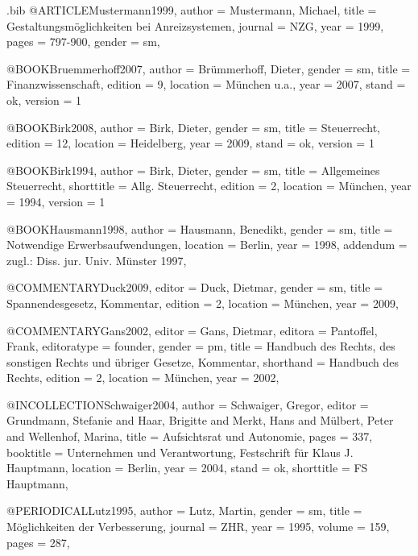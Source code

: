 %
\begin{filecontents}{\jobname.bib}
@ARTICLE{Mustermann1999,
  author = {Mustermann, Michael},
  title = {Gestaltungsmöglichkeiten bei Anreizsystemen},
  journal = {NZG},
  year = {1999},
  pages = {797-900},
  gender = {sm},
}

@BOOK{Bruemmerhoff2007,
  author = {Brümmerhoff, Dieter},
  gender = {sm},
  title = {Finanzwissenschaft},
  edition = {9},
  location = {München u.a.},
  year = {2007},
  stand = {ok},
  version = {1}
}

@BOOK{Birk2008,
  author = {Birk, Dieter},
  gender = {sm},
  title = {Steuerrecht},
  edition = {12},
  location = {Heidelberg},
  year = {2009},
  stand = {ok},
  version = {1}
}

@BOOK{Birk1994,
  author = {Birk, Dieter},
  gender = {sm},
  title = {Allgemeines Steuerrecht},
  shorttitle = {Allg. Steuerrecht},
  edition = {2},
  location = {München},
  year = {1994},
  version = {1}
}

@BOOK{Hausmann1998,
  author = {Hausmann, Benedikt},
  gender = {sm},
  title = {Notwendige Erwerbsaufwendungen},
  location = {Berlin},
  year = {1998},
  addendum = {zugl.: Diss. jur. Univ. Münster 1997},
}

@COMMENTARY{Duck2009,
  editor = {Duck, Dietmar},
  gender = {sm},
  title = {Spannendesgesetz, Kommentar},
  edition = {2},
  location = {München},
  year = {2009},
}

@COMMENTARY{Gans2002,
  editor = {Gans, Dietmar},
  editora = {Pantoffel, Frank},
  editoratype = {founder},
  gender = {pm},
  title = {Handbuch des Rechts, des sonstigen Rechts und übriger Gesetze, Kommentar},
  shorthand = {Handbuch des Rechts},
  edition = {2},
  location = {München},
  year = {2002},
}

@INCOLLECTION{Schwaiger2004,
  author = {Schwaiger, Gregor},
  editor = {Grundmann, Stefanie and Haar, Brigitte and Merkt, Hans and Mülbert,
	Peter and Wellenhof, Marina},
  title = {Aufsichtsrat und Autonomie},
  pages = {337},
  booktitle = {Unternehmen und Verantwortung, Festschrift für Klaus J. Hauptmann},
  location = {Berlin},
  year = {2004},
  stand = {ok},
  shorttitle = {FS Hauptmann},
}

@PERIODICAL{Lutz1995,
  author = {Lutz, Martin},
  gender = {sm},
  title = {Möglichkeiten der Verbesserung},
  journal = {ZHR},
  year = {1995},
  volume = {159},
  pages = {287},
}


\end{filecontents}
